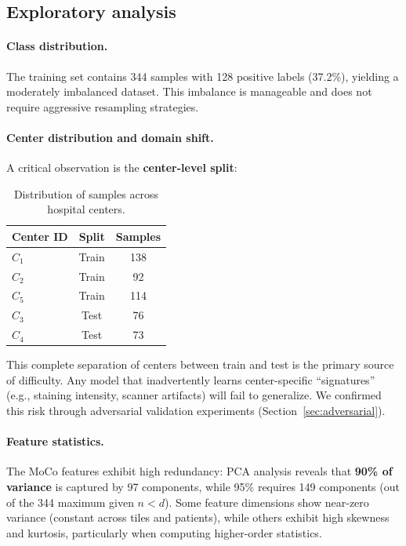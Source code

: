 \documentclass[11pt,a4paper]{article}
\begin{document}
\subsection{Exploratory analysis}

\paragraph{Class distribution.}
The training set contains 344 samples with 128 positive labels (37.2\%), yielding a moderately imbalanced dataset. This imbalance is manageable and does not require aggressive resampling strategies.

\paragraph{Center distribution and domain shift.}
A critical observation is the \textbf{center-level split}:

\begin{table}[H]
    \centering
    \caption{Distribution of samples across hospital centers.}
    \begin{tabular}{lcc}
        \toprule
        \textbf{Center ID} & \textbf{Split} & \textbf{Samples} \\
        \midrule
        $C_1$ & Train & 138 \\
        $C_2$ & Train & 92 \\
        $C_5$ & Train & 114 \\
        $C_3$ & Test  & 76  \\
        $C_4$ & Test  & 73  \\
        \bottomrule
    \end{tabular}
    \label{tab:centers}
\end{table}

This complete separation of centers between train and test is the primary source of difficulty. Any model that inadvertently learns center-specific ``signatures'' (e.g., staining intensity, scanner artifacts) will fail to generalize. We confirmed this risk through adversarial validation experiments (Section~\ref{sec:adversarial}).

\paragraph{Feature statistics.}
The MoCo features exhibit high redundancy: PCA analysis reveals that \textbf{90\% of variance} is captured by 97 components, while 95\% requires 149 components (out of the 344 maximum given $n < d$). Some feature dimensions show near-zero variance (constant across tiles and patients), while others exhibit high skewness and kurtosis, particularly when computing higher-order statistics.
\end{document}
